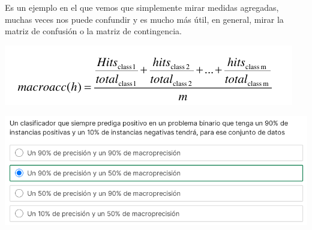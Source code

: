 Es un ejemplo en el que vemos que simplemente mirar medidas agregadas, muchas veces nos puede confundir y es mucho más útil, en general, mirar la matriz de confusión o la matriz de contingencia.
\begin{center}
    \includegraphics[scale=.75]{images/mod02-15.png}
\end{center}

\begin{center}
    \includegraphics[scale=.75]{images/mod02-16.png}
\end{center}


